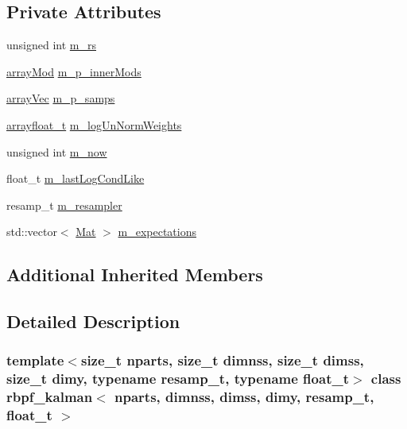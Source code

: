 \subsection*{Private Attributes}
\begin{DoxyCompactItemize}
\item 
unsigned int \hyperlink{classrbpf__kalman_a625192fecb630044a08a445f0abb7cdf}{m\+\_\+rs}
\item 
\hyperlink{classrbpf__kalman_a99e5cb365f01f83962440f29357744d9}{array\+Mod} \hyperlink{classrbpf__kalman_ad6ff53f5ea23c35d3c7154b31a50bb34}{m\+\_\+p\+\_\+inner\+Mods}
\item 
\hyperlink{classrbpf__kalman_ad0c2ef4db6363157244741517daae136}{array\+Vec} \hyperlink{classrbpf__kalman_a88f7188c59b2cc1407a14e60051a1840}{m\+\_\+p\+\_\+samps}
\item 
\hyperlink{classrbpf__kalman_a77493b35e7848d5bd91904701adabbbc}{arrayfloat\+\_\+t} \hyperlink{classrbpf__kalman_a086f86066051a4f955b7b8b922a932af}{m\+\_\+log\+Un\+Norm\+Weights}
\item 
unsigned int \hyperlink{classrbpf__kalman_a0c27a82501d16ed1a8b427c053d47c93}{m\+\_\+now}
\item 
float\+\_\+t \hyperlink{classrbpf__kalman_adb1cf2ea7161d4a6e5a9a7240b9cdff1}{m\+\_\+last\+Log\+Cond\+Like}
\item 
resamp\+\_\+t \hyperlink{classrbpf__kalman_a8ecaad1e77a122988843b2a0a33f882d}{m\+\_\+resampler}
\item 
std\+::vector$<$ \hyperlink{classrbpf__kalman_a736704f31949e04f537aa8b7263e44af}{Mat} $>$ \hyperlink{classrbpf__kalman_ab44eceb581029abcce88710ef7f9c38f}{m\+\_\+expectations}
\end{DoxyCompactItemize}
\subsection*{Additional Inherited Members}


\subsection{Detailed Description}
\subsubsection*{template$<$size\+\_\+t nparts, size\+\_\+t dimnss, size\+\_\+t dimss, size\+\_\+t dimy, typename resamp\+\_\+t, typename float\+\_\+t$>$\newline
class rbpf\+\_\+kalman$<$ nparts, dimnss, dimss, dimy, resamp\+\_\+t, float\+\_\+t $>$}

